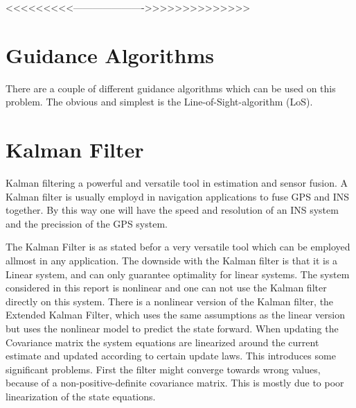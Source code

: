 	<<<<<<<<<---------------------->>>>>>>>>>>>>>

\section{Guidance Algorithms}
	There are a couple of different guidance algorithms which can be used on this problem. The obvious and simplest is the Line-of-Sight-algorithm (LoS).

\section{Kalman Filter}
	Kalman filtering a powerful and versatile tool in estimation and sensor fusion. A Kalman filter is usually employd in navigation applications to fuse GPS and INS together. By this way one will have the speed and resolution of an INS system and the precission of the GPS system. 

	The Kalman Filter is as stated befor a very versatile tool which can be employed allmost in any application. The downside with the Kalman filter is that it is a Linear system, and can only guarantee optimality for linear systems. The system considered in this report is nonlinear and one can not use the Kalman filter directly on this system. There is a nonlinear version of the Kalman filter, the Extended Kalman Filter, which uses the same assumptions as the linear version but uses the nonlinear model to predict the state forward. When updating the Covariance matrix the system equations are linearized around the current estimate and updated according to certain update laws. This introduces some significant problems. First the filter might converge towards wrong values, because of a non-positive-definite covariance matrix. This is mostly due to poor linearization of the state equations. \cite{kalman}
	
	
	

